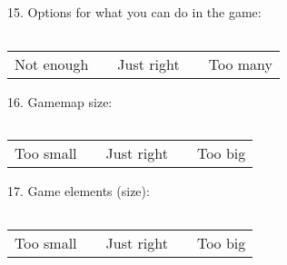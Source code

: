 15. Options for what you can do in the game:
\begin{center}
 	\begin{tabular}{| p{1cm} | p{1cm} | p{1cm} | p{1cm} | p{1cm} |}
    	\hline
     	&  &  &  &  \\ \hline
  	\end{tabular}
\end{center}
\begin{center}
	\begin{tabular}{ >{\centering\arraybackslash}p{1cm}  >{\centering\arraybackslash}p{1cm}  >{\centering\arraybackslash}p{1cm}  >{\centering\arraybackslash}p{1cm}  >{\centering\arraybackslash}p{1cm} }
    Not enough &  & Just right &  & Too many \\ 
 	\end{tabular}
\end{center}

16. Gamemap size:
\begin{center}
 	\begin{tabular}{| p{1cm} | p{1cm} | p{1cm} | p{1cm} | p{1cm} |}
    	\hline
     	&  &  &  &  \\ \hline
  	\end{tabular}
\end{center}
\begin{center}
	\begin{tabular}{ >{\centering\arraybackslash}p{1cm}  >{\centering\arraybackslash}p{1cm}  >{\centering\arraybackslash}p{1cm}  >{\centering\arraybackslash}p{1cm}  >{\centering\arraybackslash}p{1cm} }
    Too small &  & Just right &  & Too big \\ 
 	\end{tabular}
\end{center}

17. Game elements (size):
\begin{center}
 	\begin{tabular}{| p{1cm} | p{1cm} | p{1cm} | p{1cm} | p{1cm} |}
    	\hline
     	&  &  &  &  \\ \hline
  	\end{tabular}
\end{center}
\begin{center}
	\begin{tabular}{ >{\centering\arraybackslash}p{1cm}  >{\centering\arraybackslash}p{1cm}  >{\centering\arraybackslash}p{1cm}  >{\centering\arraybackslash}p{1cm}  >{\centering\arraybackslash}p{1cm} }
    Too small &  & Just right &  & Too big \\ 
 	\end{tabular}
\end{center}

